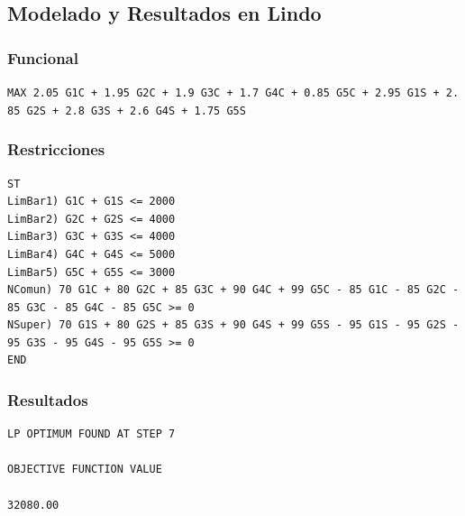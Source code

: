 \documentclass[
]{article}
\begin{document}
\hypertarget{modelado-y-resultados-en-lindo}{%
\subsection{Modelado y Resultados en
Lindo}\label{modelado-y-resultados-en-lindo}}

\hypertarget{funcional}{%
\subsubsection{Funcional}\label{funcional}}

\texttt{MAX\ 2.05\ G1C\ +\ 1.95\ G2C\ +\ 1.9\ G3C\ +\ 1.7\ G4C\ +\ 0.85\ G5C\ +\ 2.95\ G1S\ +\ 2.85\ G2S\ +\ 2.8\ G3S\ +\ 2.6\ G4S\ +\ 1.75\ G5S}

\hypertarget{restricciones-1}{%
\subsubsection{Restricciones}\label{restricciones-1}}

\begin{lstlisting}
ST
LimBar1) G1C + G1S <= 2000
LimBar2) G2C + G2S <= 4000
LimBar3) G3C + G3S <= 4000
LimBar4) G4C + G4S <= 5000
LimBar5) G5C + G5S <= 3000
NComun) 70 G1C + 80 G2C + 85 G3C + 90 G4C + 99 G5C - 85 G1C - 85 G2C - 85 G3C - 85 G4C - 85 G5C >= 0
NSuper) 70 G1S + 80 G2S + 85 G3S + 90 G4S + 99 G5S - 95 G1S - 95 G2S - 95 G3S - 95 G4S - 95 G5S >= 0
END
\end{lstlisting}

\hypertarget{resultados}{%
\subsubsection{Resultados}\label{resultados}}

\begin{lstlisting}
LP OPTIMUM FOUND AT STEP 7

OBJECTIVE FUNCTION VALUE

32080.00
\end{lstlisting}
\end{document}
